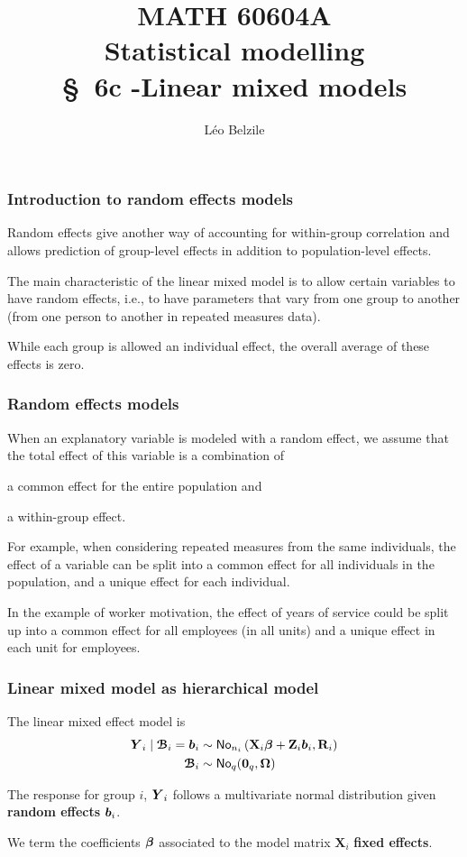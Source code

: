 \documentclass{beamer}
\title[\color{white}{MATH 60604A \S~6c - Linear mixed models}]{\texorpdfstring{MATH 60604A \\Statistical modelling \\ \S~6c -Linear mixed models}{MATH 60604A \\Statistical modelling \\ \S~6c - Linear mixed models}}
\author{Léo Belzile}
\institute{HEC Montréal\\
Department of Decision Sciences}
\date{}
\begin{document}
\frame{\titlepage}



\begin{frame}
\frametitle{Introduction to random effects models}
 Random effects give another way of accounting for within-group correlation and allows prediction of group-level effects in addition to population-level effects.
 \bi \item The main characteristic of the \alert{linear mixed model} is to allow certain variables to have \alert{random effects}, i.e., \alert{to have parameters that vary from one group to another} (from one person to another in repeated measures data). 
\item While each group is allowed an individual effect, the overall average of these effects is zero.
\ei
\end{frame}

\begin{frame}[fragile]
\frametitle{Random effects models}
\bi
\item When an explanatory variable is modeled with a random effect, we assume that \alert{the total effect of this variable is a combination of}
\be

\item a \alert{common effect} for the entire population and  
\item a \alert{within-group effect}. 
\ee
\item For example, when considering repeated measures from the same individuals, the effect of a variable can be split into a common effect for all individuals in the population, and a unique effect for each individual. 
\item In the example of worker motivation, the effect of years of service could be split up into a common effect for all employees (in all units) and a unique effect in each unit for employees.
\ei
\end{frame}
\begin{frame}
 \frametitle{Linear mixed model as hierarchical model}
The linear mixed effect model is 
 \begin{align*}
  \boldsymbol {Y}_i \mid \boldsymbol {\mathcal{B}}_i =\boldsymbol {b}_i &\sim \mathsf{No}_{n_i}\left( \mathbf{X}_i \boldsymbol {\beta} + \mathbf{Z}_i\boldsymbol {b}_i, \mathbf{R}_i\right) \\
  \boldsymbol {\mathcal{B}}_i & \sim \mathsf{No}_{q}( \boldsymbol {0}_q, \boldsymbol {\Omega})
 \end{align*}

 \bi \item 
 The response for group $i$, $\boldsymbol {Y}_i$ follows a multivariate normal distribution given \textbf{random effects} $\boldsymbol {b}_i$.
 \item 
 We term the coefficients $\boldsymbol {\beta}$ associated to the model matrix $\mathbf{X}_i$ \textbf{fixed effects}.
 \ei 
\end{frame}
\end{document}
